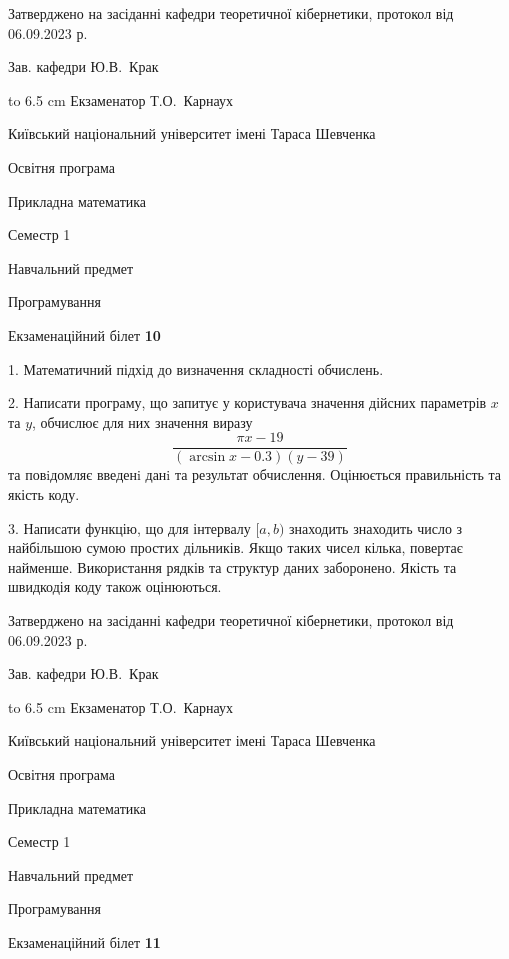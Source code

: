 \documentclass[12pt, ukrainian]{article}
\begin{document}
{\smallskip\smallskip \begin {scriptsize} Затверджено на засіданні кафедри теоретичної кібернетики, протокол   від   06.09.2023 р.\par\smallskip\smallskip\smallskip\smallskip
{\parbox {6.5 cm} {Зав. кафедри \dotfill Ю.В.~Крак}}\hspace {0.7cm} {\hbox to 6.5 cm { Екзаменатор \dotfill Т.О.~Карнаух}} \end{scriptsize}}
\newpage
{{\begin {scriptsize}\par
{ \center  Київський національний університет імені Тараса Шевченка \par}
{\parbox {5 cm}{Освітня програма \hfill}{\parbox {7 cm}{Прикладна математика\hfill}}\parbox {6 cm}{\hfill Семестр 1}}\par
{\parbox {5 cm} {Навчальний предмет \hfill}\parbox {7 cm}{Програмування \hfill}\parbox {6cm}{\hfill}\par}\vspace{-15pt} \end{scriptsize}}{\center Екзаменаційний білет \No \textbf { 10 }\par}}
{%
1. Математичний підхід до визначення складності обчислень.%
\par
2. Написати програму, що запитує у користувача значення дійсних параметрів $x$ та $y$, обчислює для них значення виразу 
$$\frac{\pi x - 19}{(\arcsin x - 0.3) (y - 39)}$$ 
та повiдомляє введенi данi та результат обчислення.
 Оцінюється правильність та якість коду.

\par
3. Написати функцію, що для інтервалу $[a, b)$ знаходить знаходить число з найбільшою сумою простих дільників. Якщо таких чисел кілька, повертає найменше.  Використання рядків та структур даних заборонено. Якість та швидкодія коду також оцінюються. 

}
{\smallskip\smallskip \begin {scriptsize} Затверджено на засіданні кафедри теоретичної кібернетики, протокол   від   06.09.2023 р.\par\smallskip\smallskip\smallskip\smallskip
{\parbox {6.5 cm} {Зав. кафедри \dotfill Ю.В.~Крак}}\hspace {0.7cm} {\hbox to 6.5 cm { Екзаменатор \dotfill Т.О.~Карнаух}} \end{scriptsize}}
\vspace{0.9cm}
{{\begin {scriptsize}\par
{ \center  Київський національний університет імені Тараса Шевченка \par}
{\parbox {5 cm}{Освітня програма \hfill}{\parbox {7 cm}{Прикладна математика\hfill}}\parbox {6 cm}{\hfill Семестр 1}}\par
{\parbox {5 cm} {Навчальний предмет \hfill}\parbox {7 cm}{Програмування \hfill}\parbox {6cm}{\hfill}\par}\vspace{-15pt} \end{scriptsize}}{\center Екзаменаційний білет \No \textbf { 11 }\par}}
\end{document}
